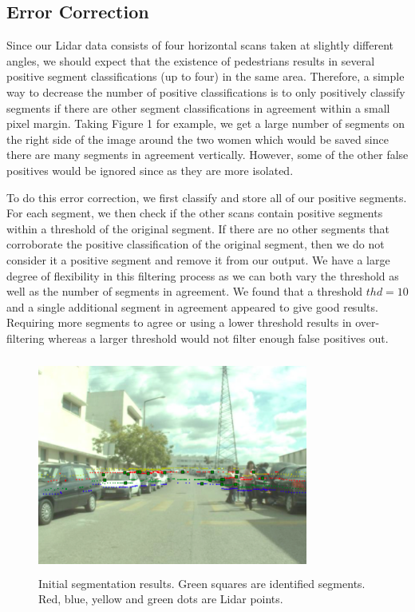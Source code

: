 \documentclass[10pt,twocolumn,letterpaper]{article}
\begin{document}
  \subsection{Error Correction}
  Since our Lidar data consists of four horizontal scans taken at slightly different angles,
  we should expect that the existence of pedestrians results in several positive segment
  classifications (up to four) in the same area. Therefore, a simple way to decrease
  the number of positive classifications is to only positively classify segments if there
  are other segment classifications in agreement within a small pixel margin.
  Taking Figure 1 for example, we get a large number of segments on the right side
  of the image around the two women which would be saved since there are many segments in
  agreement vertically. However, some of the other false positives would be ignored
  since as they are more isolated.

  To do this error correction, we first classify and store all of our positive segments. For each
  segment, we then check if the other scans contain positive segments within a threshold
  of the original segment. If there are no other segments that corroborate
  the positive classification of the original segment, then we do not consider it a positive
  segment and remove it from our output. We have a large degree of flexibility in
  this filtering process as we can both vary the threshold as well as the number of segments
  in agreement. We found that a threshold $ thd = 10 $ and a single additional segment in
  agreement appeared to give good results. Requiring more segments to agree or using a lower
  threshold results in over-filtering whereas a larger threshold would not filter enough
  false positives out.

  \begin{figure}
    \includegraphics[height=2.8in, width=3.5in]{images/initial_result.png}
    \caption{ Initial segmentation results. Green squares are identified
    segments. Red, blue, yellow and green dots are Lidar points.}
  \end{figure}
\end{document}

